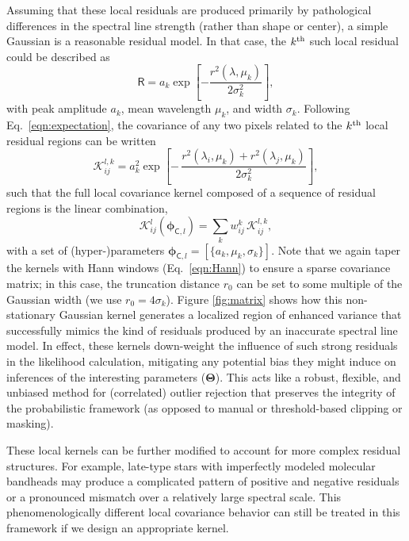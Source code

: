\documentclass[iop,floatfix]{emulateapj}
\newcommand{\vR}{\mathsf{R}}
\newcommand{\vT}{ {\bm \Theta}}
\newcommand{\vp}{ {\bm \phi}}
\newcommand{\KK}{\mathcal{K}}
\newcommand{\Klocal}{\KK^l}
\begin{document}
Assuming that these local residuals are produced primarily by pathological differences in the 
spectral line strength (rather than shape or center), a simple Gaussian is a reasonable residual 
model.  In that case, the $k^{\rm th}$ such local residual could be described as
\begin{equation}
\vR = a_k \exp \left[ - \frac{r^2(\lambda,\mu_k)}{2\sigma_k^2} \right],
\end{equation}
with peak amplitude $a_k$, mean wavelength $\mu_k$, and width $\sigma_k$.  Following 
Eq.~\ref{eqn:expectation}, the covariance of any two pixels related to the $k^{\rm th}$ local 
residual regions can be written
\begin{equation} \label{eqn:kregion}
  \mathcal{K}^{l,k}_{ij} = a_k^2 \exp \left [ - \, \frac{r^2(\lambda_i, \mu_k) + r^2(\lambda_j, \mu_k)}{2 \sigma_k^2}\right ],
\end{equation}
such that the full local covariance kernel composed of a sequence of residual regions is the linear 
combination,
\begin{equation} \label{eqn:klocal}
\Klocal_{ij}(\vp_{{\mathsf C},l}) = \sum_k w^k_{ij} \, \mathcal{K}^{l,k}_{ij},
\end{equation}
with a set of (hyper-)parameters $\vp_{{\mathsf C},l} = [\{a_k, \mu_k, \sigma_k\}]$.  Note that we 
again taper the kernels with Hann windows (Eq.~\ref{eqn:Hann}) to ensure a sparse covariance 
matrix; in this case, the truncation distance $r_0$ can be set to some multiple of the Gaussian 
width (we use $r_0 = 4\sigma_k$).  Figure \ref{fig:matrix} shows how this non-stationary Gaussian 
kernel generates a localized region of enhanced variance that successfully mimics the kind of 
residuals produced by an inaccurate spectral line model.  In effect, these kernels down-weight the 
influence of such strong residuals in the likelihood calculation, mitigating any potential bias 
they might induce on inferences of the interesting parameters ($\vT$).  This acts like a robust, 
flexible, and unbiased method for (correlated) outlier rejection that preserves the integrity of 
the probabilistic framework (as opposed to manual or threshold-based clipping or masking).  

These local kernels can be further modified to account for more complex residual structures.  For 
example, late-type stars with imperfectly modeled molecular bandheads may produce a complicated 
pattern of positive and negative residuals or a pronounced mismatch over a relatively large 
spectral scale.  This phenomenologically different local covariance behavior can still be treated 
in this framework if we design an appropriate kernel. 
\end{document}

